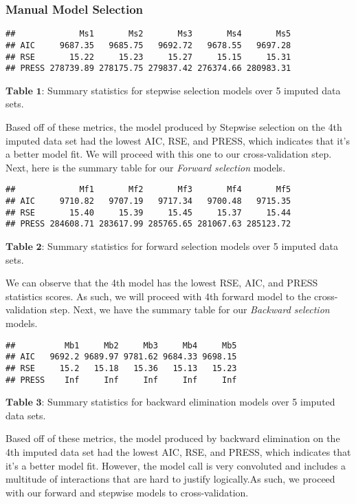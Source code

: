 \documentclass[]{article}
\begin{document}
\subsubsection{Manual Model Selection}\label{manual-model-selection}

\begin{verbatim}
##             Ms1       Ms2       Ms3       Ms4       Ms5
## AIC     9687.35   9685.75   9692.72   9678.55   9697.28
## RSE       15.22     15.23     15.27     15.15     15.31
## PRESS 278739.89 278175.75 279837.42 276374.66 280983.31
\end{verbatim}

\(\textbf{Table 1}\): Summary statistics for stepwise selection models
over 5 imputed data sets.

Based off of these metrics, the model produced by Stepwise selection on
the 4th imputed data set had the lowest AIC, RSE, and PRESS, which
indicates that it's a better model fit. We will proceed with this one to
our cross-validation step. Next, here is the summary table for our
\emph{Forward selection} models.

\begin{verbatim}
##             Mf1       Mf2       Mf3       Mf4       Mf5
## AIC     9710.82   9707.19   9717.34   9700.48   9715.35
## RSE       15.40     15.39     15.45     15.37     15.44
## PRESS 284608.71 283617.99 285765.65 281067.63 285123.72
\end{verbatim}

\(\textbf{Table 2}\): Summary statistics for forward selection models
over 5 imputed data sets.

We can observe that the 4th model has the lowest RSE, AIC, and PRESS
statistics scores. As such, we will proceed with 4th forward model to
the cross-validation step. Next, we have the summary table for our
\emph{Backward selection} models.

\begin{verbatim}
##          Mb1     Mb2     Mb3     Mb4     Mb5
## AIC   9692.2 9689.97 9781.62 9684.33 9698.15
## RSE     15.2   15.18   15.36   15.13   15.23
## PRESS    Inf     Inf     Inf     Inf     Inf
\end{verbatim}

\(\textbf{Table 3}\): Summary statistics for backward elimination models
over 5 imputed data sets.

Based off of these metrics, the model produced by backward elimination
on the 4th imputed data set had the lowest AIC, RSE, and PRESS, which
indicates that it's a better model fit. However, the model call is very
convoluted and includes a multitude of interactions that are hard to
justify logically.As such, we proceed with our forward and stepwise
models to cross-validation.
\end{document}
